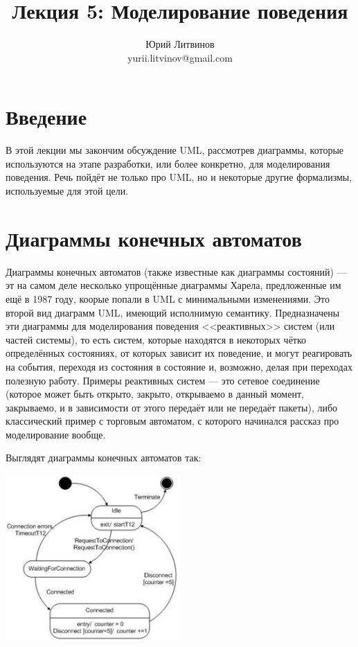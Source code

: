 \documentclass[a5paper]{article}
\title{Лекция 5:  Моделирование поведения}
\author{Юрий Литвинов\\\small{yurii.litvinov@gmail.com}}
\date{}
\begin{document}
\maketitle
\thispagestyle{empty}

\section{Введение}

В этой лекции мы закончим обсуждение UML, рассмотрев диаграммы, которые используются на этапе разработки, или более конкретно, для моделирования поведения. Речь пойдёт не только про UML, но и некоторые другие формализмы, используемые для этой цели.

\section{Диаграммы конечных автоматов}

Диаграммы конечных автоматов (также известные как диаграммы состояний) --- эт на самом деле несколько упрощённые диаграммы Харела, предложенные им ещё в 1987 году, коорые попали в UML с минимальными изменениями. Это второй вид диаграмм UML, имеющий исполнимую семантику. Предназначены эти диаграммы для моделирования поведения <<реактивных>> систем (или частей системы), то есть систем, которые находятся в некоторых чётко определённых состояниях, от которых зависит их поведение, и могут реагировать на события, переходя из состояния в состояние и, возможно, делая при переходах полезную работу. Примеры реактивных систем --- это сетевое соединение (которое может быть открыто, закрыто, открываемо в данный момент, закрываемо, и в зависимости от этого передаёт или не передаёт пакеты), либо классический пример с торговым автоматом, с которого начинался рассказ про моделирование вообще.

Выглядят диаграммы конечных автоматов так:

\begin{center}
	\includegraphics[width=0.5\textwidth]{stateTransitionExample.png}
\end{center}
\end{document}
